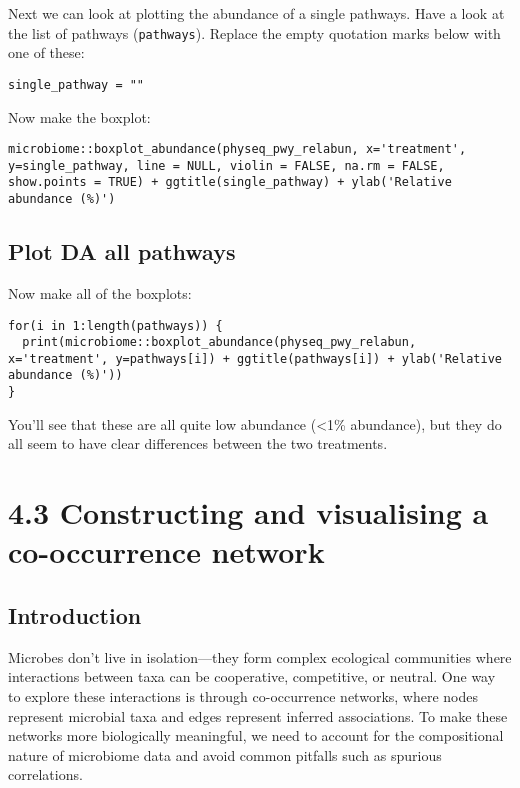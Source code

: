\documentclass[
]{book}
\begin{document}
Next we can look at plotting the abundance of a single pathways. Have a look at the list of pathways (\texttt{pathways}). Replace the empty quotation marks below with one of these:

\begin{verbatim}
single_pathway = ""
\end{verbatim}

Now make the boxplot:

\begin{verbatim}
microbiome::boxplot_abundance(physeq_pwy_relabun, x='treatment', y=single_pathway, line = NULL, violin = FALSE, na.rm = FALSE, show.points = TRUE) + ggtitle(single_pathway) + ylab('Relative abundance (%)')
\end{verbatim}

\subsection{Plot DA all pathways}\label{plot-da-all-pathways}

Now make all of the boxplots:

\begin{verbatim}
for(i in 1:length(pathways)) {
  print(microbiome::boxplot_abundance(physeq_pwy_relabun, x='treatment', y=pathways[i]) + ggtitle(pathways[i]) + ylab('Relative abundance (%)'))
}
\end{verbatim}

You'll see that these are all quite low abundance (\textless1\% abundance), but they do all seem to have clear differences between the two treatments.

\section{4.3 Constructing and visualising a co-occurrence network}\label{constructing-and-visualising-a-co-occurrence-network}

\subsection{Introduction}\label{introduction-4}

Microbes don't live in isolation---they form complex ecological communities where interactions between taxa can be cooperative, competitive, or neutral. One way to explore these interactions is through co-occurrence networks, where nodes represent microbial taxa and edges represent inferred associations. To make these networks more biologically meaningful, we need to account for the compositional nature of microbiome data and avoid common pitfalls such as spurious correlations.
\end{document}
